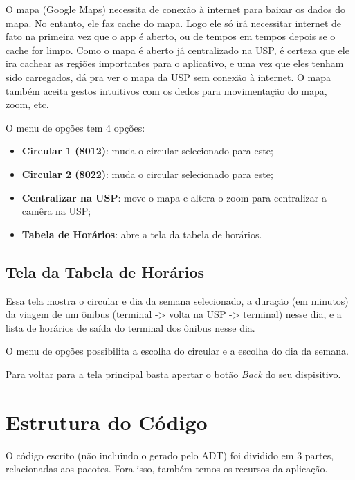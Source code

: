 O mapa (Google Maps) necessita de conexão à internet para baixar os dados do mapa. No entanto, ele faz cache 
do mapa. Logo ele só irá necessitar internet de fato na primeira vez que o app é aberto, ou de tempos em tempos
depois se o cache for limpo. Como o mapa é aberto já centralizado na USP, é certeza que ele ira cachear as
regiões importantes para o aplicativo, e uma vez que eles tenham sido carregados, dá pra ver o mapa da USP
sem conexão à internet.
O mapa também aceita gestos intuitivos com os dedos para movimentação do mapa, zoom, etc.

O menu de opções tem 4 opções:
\begin{itemize}
    \item \textbf{Circular 1 (8012)}: muda o circular selecionado para este;
    \item \textbf{Circular 2 (8022)}: muda o circular selecionado para este;
    \item \textbf{Centralizar na USP}: move o mapa e altera o zoom para centralizar a camêra na USP;
    \item \textbf{Tabela de Horários}: abre a tela da tabela de horários.
\end{itemize}

\subsection{Tela da Tabela de Horários}
Essa tela mostra o circular e dia da semana selecionado, a duração (em minutos) da viagem de um ônibus
(terminal -> volta na USP -> terminal) nesse dia, e a lista de horários de saída do terminal dos ônibus
nesse dia.

O menu de opções possibilita a escolha do circular e a escolha do dia da semana.

Para voltar para a tela principal basta apertar o botão \textit{Back} do seu dispisitivo.

\section{Estrutura do Código}
O código escrito (não incluindo o gerado pelo ADT) foi dividido
em 3 partes, relacionadas aos pacotes. Fora isso, também temos os
recursos da aplicação.

